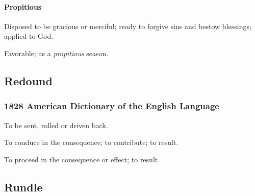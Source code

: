 			\paragraph{Propitious}
			
				\begin{compactitem}
					\item[1] Disposed to be gracious or merciful; ready to forgive sins and bestow blessings; applied to God.
					\item[2] Favorable; as a \textit{propitious} season.
				\end{compactitem}
	
		

	\subsection{Redound} %
		\label{REDOUND}
	
		\subsubsection{1828 American Dictionary of the English Language}

			\begin{compactitem}
				\item[1] To be sent, rolled or driven back.
				\item[2] To conduce in the consequence; to contribute; to result.
				\item[3] To proceed in the consequence or effect; to result.
			\end{compactitem}

	\subsection{Rundle} %
		\label{RUNDLE}
	

